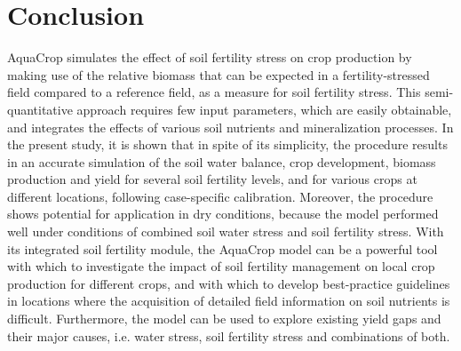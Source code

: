 \section{Conclusion}
AquaCrop simulates the effect of soil fertility stress on crop production by making use of the relative biomass that can be expected in a fertility-stressed field compared to a reference field, as a measure for soil fertility stress. This semi-quantitative approach requires few input parameters, which are easily obtainable, and integrates the effects of various soil nutrients and mineralization processes. In the present study, it is shown that in spite of its simplicity, the procedure results in an accurate simulation of the soil water balance, crop development, biomass production and yield for several soil fertility levels, and for various crops at different locations, following case-specific calibration. Moreover, the procedure shows potential for application in dry conditions, because the model performed well under conditions of combined soil water stress and soil fertility stress. With its integrated soil fertility module, the AquaCrop model can be a powerful tool with which to investigate the impact of soil fertility management on local crop production for different crops, and with which to develop best-practice guidelines in locations where the acquisition of detailed field information on soil nutrients is difficult. Furthermore, the model can be used to explore existing yield gaps and their major causes, i.e. water stress, soil fertility stress and combinations of both.

\cleardoublepage